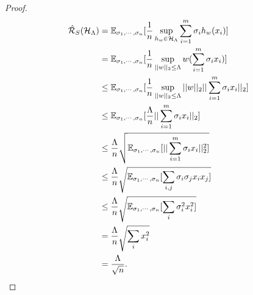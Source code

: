 \documentclass[../main.tex]{subfiles}
\begin{document}
	\begin{proof}
		\begin{equation*}
			\begin{aligned}
				\hat{\mathcal{R}}_S(\mathcal{H}_{\Lambda}) & = \mathbb{E}_{\sigma_1, \cdots, \sigma_n} [\frac{1}{n} \sup\limits_{h_w \in \mathcal{H}_{\Lambda}} \sum\limits_{i=1}^m \sigma_i h_w(x_i)] \\
				& = \mathbb{E}_{\sigma_1, \cdots, \sigma_n} [\frac{1}{n} \sup\limits_{||w||_2\leq \Lambda } w(\sum\limits_{i=1}^m \sigma_i x_i)]\\
				& \leq \mathbb{E}_{\sigma_1, \cdots, \sigma_n} [\frac{1}{n} \sup\limits_{||w||_2\leq \Lambda } ||w||_2 ||\sum\limits_{i=1}^m \sigma_i x_i||_2] \\
				& 	\leq \mathbb{E}_{\sigma_1, \cdots, \sigma_n} [\frac{\Lambda}{n}  ||\sum\limits_{i=1}^m \sigma_i x_i||_2] \\
				& 	\leq \frac{\Lambda}{n}   \sqrt{\mathbb{E}_{\sigma_1, \cdots, \sigma_n} [||\sum\limits_{i=1}^m \sigma_i x_i||^2_2]} \\	
				& 	\leq \frac{\Lambda}{n}   \sqrt{\mathbb{E}_{\sigma_1, \cdots, \sigma_n} [\sum\limits_{i,j} \sigma_i \sigma_j x_i x_j]} \\
			& 	\leq \frac{\Lambda}{n}   \sqrt{\mathbb{E}_{\sigma_1, \cdots, \sigma_n} [\sum\limits_{i} \sigma_i^2 x_i^2]} \\	
			& 	= \frac{\Lambda}{n}   \sqrt{\sum\limits_{i}  x_i^2} \\	
						& 	= \frac{\Lambda}{\sqrt{n}} .									
			\end{aligned}
		\end{equation*}
	\end{proof}
\end{document}
